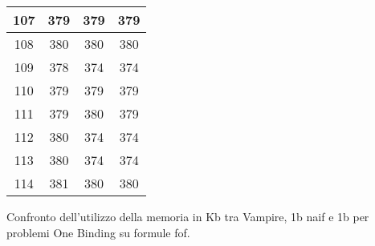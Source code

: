 \begin{minipage}{4.73cm}
\begin{table}[H]
{\begin{tabular}{|c|c|c|c|}
    \hline
    107 & 379 & 379 & 379 \\
    \hline
    108 & 380 & 380 & 380 \\
    \hline
    109 & 378 & 374 & 374 \\
    \hline
    110 & 379 & 379 & 379 \\
    \hline
    111 & 379 & 380 & 379 \\
    \hline
    112 & 380 & 374 & 374 \\
    \hline
    113 & 380 & 374 & 374 \\
    \hline
    114 & 381 & 380 & 380 \\
    \hline
    \end{tabular}
    }
    \end{table}
    
\end{minipage}
\begin{table}[H]
    \caption{Confronto dell'utilizzo della memoria in Kb tra Vampire, 1b naif e 1b per problemi One Binding su formule fof.}
\end{table}





